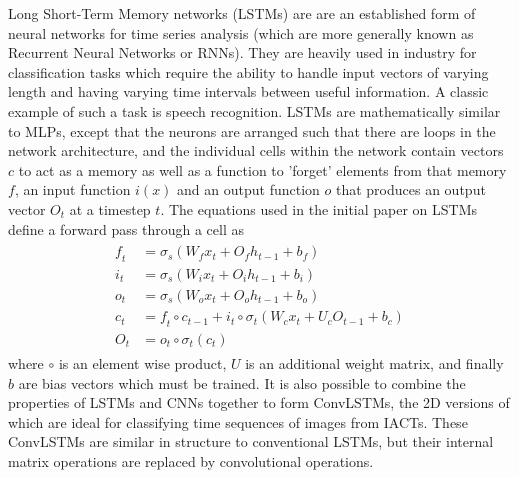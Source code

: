 Long Short-Term Memory networks (LSTMs) are are an established form of neural networks for time series analysis (which are more generally known as Recurrent Neural Networks or RNNs). They are heavily used in industry for classification tasks which require the ability to handle input vectors of varying length and having varying time intervals between useful information. A classic example of such a task is speech recognition.
LSTMs are mathematically similar to MLPs, except that the neurons are arranged such that there are loops in the network architecture, and the individual cells within the network contain vectors $\textit{c}$ to act as a memory as well as a function to 'forget' elements from that memory $\textit{f}$, an input function $\textit{i}(x)$ and an output function $\textit{o}$ that produces an output vector $O_t$ at a timestep $t$. The equations used in the initial paper on LSTMs define a forward pass through a cell \cite{Hochreiter} as
\begin{align}
\begin{split}
\textit{f}_t &= \sigma_s(W_{f} x_t + O_{f} h_{t-1} + b_f) \\
\textit{i}_t &= \sigma_s(W_{i} x_t + O_{i} h_{t-1} + b_i) \\
\textit{o}_t &= \sigma_s(W_{o} x_t + O_{o} h_{t-1} + b_o) \\
\textit{c}_t &= \textit{f}_t \circ c_{t-1} + \textit{i}_t \circ \sigma_t(W_{c} x_t + U_{c} O_{t-1} + b_c) \\
O_t &= o_t \circ \sigma_t(\textit{c}_t)
\end{split}
\end{align}
where $\circ$ is an element wise product, $U$ is an additional weight matrix, and finally $b$ are bias vectors which must be trained. It is also possible to combine the properties of LSTMs and CNNs together to form ConvLSTMs, the 2D versions of which are ideal for classifying time sequences of images from IACTs. These ConvLSTMs are similar in structure to conventional LSTMs, but their internal matrix operations are replaced by convolutional operations. 
